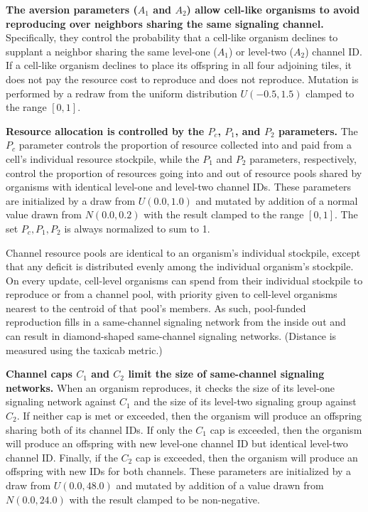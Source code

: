\textbf{
The aversion parameters ($A_1$ and $A_2$) allow cell-like organisms to avoid reproducing over neighbors sharing the same signaling channel.
}
Specifically, they control the probability that a cell-like organism declines to supplant a neighbor sharing the same level-one ($A_1$) or level-two ($A_2$) channel ID.
If a cell-like organism declines to place its offspring in all four adjoining tiles, it does not pay the resource cost to reproduce and does not reproduce.
Mutation is performed by a redraw from the uniform distribution $U(-0.5,1.5)$ clamped to the range $[0,1]$.

\textbf{
Resource allocation is controlled by the $P_{c}$, $P_1$, and $P_2$ parameters.
}
The $P_{c}$ parameter controls the proportion of resource collected into and paid from a cell's individual resource stockpile, while the $P_1$ and $P_2$ parameters, respectively, control the proportion of resources going into and out of resource pools shared by organisms with identical level-one and level-two channel IDs.
These parameters are initialized by a draw from $U(0.0, 1.0)$ and mutated by addition of a normal value drawn from $N(0.0,0.2)$ with the result clamped to the range $[0,1]$.
The set $P_{c}, P_1, P_2$ is always normalized to sum to 1.

Channel resource pools are identical to an organism's individual stockpile, except that any deficit is distributed evenly among the individual organism's stockpile.
On every update, cell-level organisms can spend from their individual stockpile to reproduce or from a channel pool, with priority given to cell-level organisms nearest to the centroid of that pool's members.
As such, pool-funded reproduction fills in a same-channel signaling network from the inside out and can result in diamond-shaped same-channel signaling networks.
(Distance is measured using the taxicab metric.)

\textbf{
Channel caps $C_1$ and $C_2$ limit the size of same-channel signaling networks.
}
When an organism reproduces, it checks the size of its level-one signaling network against $C_1$ and the size of its level-two signaling group against $C_2$.
If neither cap is met or exceeded, then the organism will produce an offspring sharing both of its channel IDs.
If only the $C_1$ cap is exceeded, then the organism will produce an offspring with new level-one channel ID but identical level-two channel ID.
Finally, if the $C_2$ cap is exceeded, then the organism will produce an offspring with new IDs for both channels.
These parameters are initialized by a draw from $U(0.0, 48.0)$ and mutated by addition of a value drawn from $N(0.0,24.0)$ with the result clamped to be non-negative.

